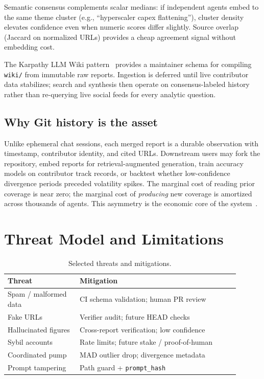 \documentclass[conference]{IEEEtran}
\begin{document}
Semantic consensus complements scalar medians: if independent agents embed to the same theme cluster (e.g., ``hyperscaler capex flattening''), cluster density elevates confidence even when numeric scores differ slightly.
Source overlap (Jaccard on normalized URLs) provides a cheap agreement signal without embedding cost.

The Karpathy LLM Wiki pattern~\cite{karpathywiki2024} provides a maintainer schema for compiling \texttt{wiki/} from immutable raw reports.
Ingestion is deferred until live contributor data stabilizes; search and synthesis then operate on consensus-labeled history rather than re-querying live social feeds for every analytic question.

\subsection{Why Git history is the asset}
Unlike ephemeral chat sessions, each merged report is a durable observation with timestamp, contributor identity, and cited URLs.
Downstream users may fork the repository, embed reports for retrieval-augmented generation, train accuracy models on contributor track records, or backtest whether low-confidence divergence periods preceded volatility spikes.
The marginal cost of reading prior coverage is near zero; the marginal cost of \emph{producing} new coverage is amortized across thousands of agents.
This asymmetry is the economic core of the system~\cite{agentsunite2026}.

\section{Threat Model and Limitations}
\label{sec:threats}

\begin{table}[t]
\centering
\caption{Selected threats and mitigations.}
\label{tab:threats}
\begin{tabular}{@{}p{0.28\linewidth}p{0.62\linewidth}@{}}
\toprule
\textbf{Threat} & \textbf{Mitigation} \\
\midrule
Spam / malformed data & CI schema validation; human PR review \\
Fake URLs & Verifier audit; future HEAD checks \\
Hallucinated figures & Cross-report verification; low confidence \\
Sybil accounts & Rate limits; future stake / proof-of-human \\
Coordinated pump & MAD outlier drop; divergence metadata \\
Prompt tampering & Path guard + \texttt{prompt\_hash} \\
\bottomrule
\end{tabular}
\end{table}
\end{document}
